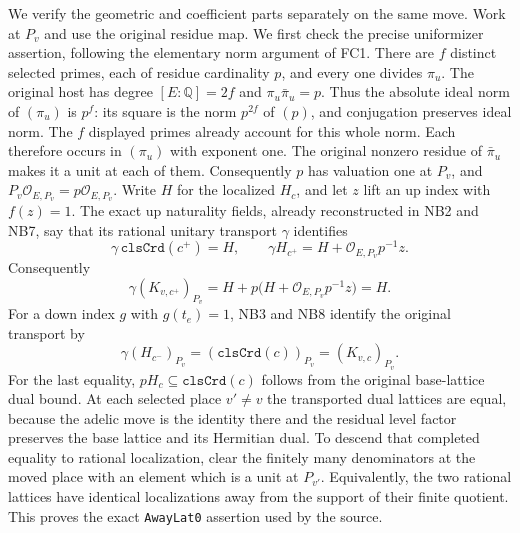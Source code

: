 We verify the geometric and coefficient parts separately on the same
move.  Work at $P_v$ and use the original residue map.  We first check
the precise uniformizer assertion, following the elementary norm
argument of FC1.  There are $f$ distinct selected primes, each of
residue cardinality $p$, and every one divides $\pi_u$.  The original
host has degree $[E:\mathbb Q]=2f$ and
$\pi_u\bar\pi_u=p$.  Thus the absolute ideal norm of $(\pi_u)$ is
$p^f$: its square is the norm $p^{2f}$ of $(p)$, and conjugation
preserves ideal norm.  The $f$ displayed primes already account for
this whole norm.  Each therefore occurs in $(\pi_u)$ with exponent
one.  The original nonzero residue of $\bar\pi_u$ makes it a unit at
each of them.  Consequently $p$ has valuation one at $P_v$, and
$P_v\mathcal O_{E,P_v}=p\mathcal O_{E,P_v}$.
Write $H$ for the localized $H_c$, and let $z$ lift an up index with
$f(z)=1$.  The exact up naturality fields, already reconstructed in
NB2 and NB7, say that its rational unitary transport $\gamma$ identifies
\[
 \gamma\,\texttt{clsCrd}(c^+)=H,\qquad
 \gamma H_{c^+}=H+\mathcal O_{E,P_v}p^{-1}z.
 \tag{GLE.22}
\]
Consequently
\[
 \gamma (K_{v,c^+})_{P_v}
   =H+p\bigl(H+\mathcal O_{E,P_v}p^{-1}z\bigr)=H.
 \tag{GLE.23}
\]
For a down index $g$ with $g(t_e)=1$, NB3 and NB8 identify the original
transport by
\[
             \gamma(H_{c^-})_{P_v}
                     =(\texttt{clsCrd}(c))_{P_v}=(K_{v,c})_{P_v}.
 \tag{GLE.24}
\]
For the last equality, $pH_c\subseteq\texttt{clsCrd}(c)$ follows from
the original base-lattice dual bound.  At each selected place $v'\ne v$
the transported dual lattices are equal, because the adelic move is
the identity there and the residual level factor preserves the base
lattice and its Hermitian dual.  To descend that completed equality
to rational localization, clear the finitely many denominators at the
moved place with an element which is a unit at $P_{v'}$.  Equivalently,
the two rational lattices have identical localizations away from the
support of their finite quotient.  This proves the exact
\texttt{AwayLat0} assertion used by the source.

